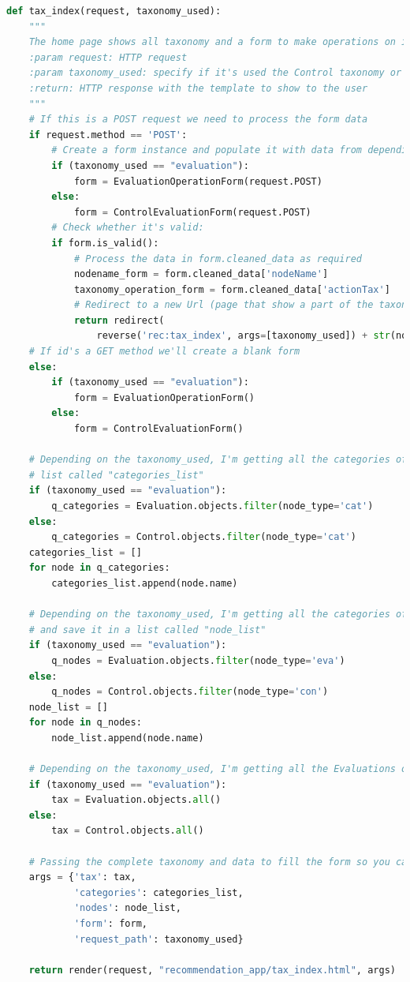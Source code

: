 \begin{lstlisting}[language=Python, label=lst:view_tax_homepage, caption={Home page dalla quale è possibile richiamare 
    diverse operazioni svolgibili sulla tassonomia.}]
def tax_index(request, taxonomy_used):
    """
    The home page shows all taxonomy and a form to make operations on it.
    :param request: HTTP request
    :param taxonomy_used: specify if it's used the Control taxonomy or the Evaluation taxonomy
    :return: HTTP response with the template to show to the user
    """
    # If this is a POST request we need to process the form data
    if request.method == 'POST':
        # Create a form instance and populate it with data from depending on the taxonomy_used
        if (taxonomy_used == "evaluation"):
            form = EvaluationOperationForm(request.POST)
        else:
            form = ControlEvaluationForm(request.POST)
        # Check whether it's valid:
        if form.is_valid():
            # Process the data in form.cleaned_data as required
            nodename_form = form.cleaned_data['nodeName']
            taxonomy_operation_form = form.cleaned_data['actionTax']
            # Redirect to a new Url (page that show a part of the taxonomy, depending on the action user has chosen):
            return redirect(
                reverse('rec:tax_index', args=[taxonomy_used]) + str(nodename_form) + '_' + taxonomy_operation_form)
    # If id's a GET method we'll create a blank form
    else:
        if (taxonomy_used == "evaluation"):
            form = EvaluationOperationForm()
        else:
            form = ControlEvaluationForm()

    # Depending on the taxonomy_used, I'm getting all the categories of Evaluations or Controls taxonomy and save it in a
    # list called "categories_list"
    if (taxonomy_used == "evaluation"):
        q_categories = Evaluation.objects.filter(node_type='cat')
    else:
        q_categories = Control.objects.filter(node_type='cat')
    categories_list = []
    for node in q_categories:
        categories_list.append(node.name)

    # Depending on the taxonomy_used, I'm getting all the categories of Evaluations or Controls node in the taxonomy
    # and save it in a list called "node_list"
    if (taxonomy_used == "evaluation"):
        q_nodes = Evaluation.objects.filter(node_type='eva')
    else:
        q_nodes = Control.objects.filter(node_type='con')
    node_list = []
    for node in q_nodes:
        node_list.append(node.name)

    # Depending on the taxonomy_used, I'm getting all the Evaluations or Controls taxonomy
    if (taxonomy_used == "evaluation"):
        tax = Evaluation.objects.all()
    else:
        tax = Control.objects.all()

    # Passing the complete taxonomy and data to fill the form so you can operate on the taxonomy
    args = {'tax': tax,
            'categories': categories_list,
            'nodes': node_list,
            'form': form,
            'request_path': taxonomy_used}

    return render(request, "recommendation_app/tax_index.html", args)
\end{lstlisting}
